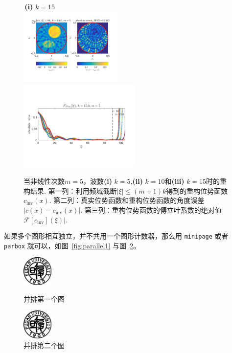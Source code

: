 \begin{figure}[H]
\,\hfill \textbf{(i)} $k = 15$ \hfill\,\\
\includegraphics[width=0.45\textwidth,trim=20 60 20 35,clip]{./figs/pwc_5_Ic_0150.png}
\includegraphics[width=0.54\textwidth,trim=10 60 30 90,clip]{./figs/pwc_5_Fc_0150.png}\\
\caption[算法2：不连续位势的重构结果]{当非线性次数$m=5$，波数\textbf{(i)} $k = 5$,\textbf{(ii)} $k = 10$和\textbf{(iii)} $k = 15$时的重构结果.
第一列：利用频域截断$|\xi| \leq (m+1)k$得到的重构位势函数$c_{\textrm{inv}}(x)$.
第二列：真实位势函数和重构位势函数的角度误差$|c(x) - c_{\textrm{inv}}(x)|$.
第三列：重构位势函数的傅立叶系数的绝对值$\mathcal{F}[c_{\textrm{inv}}](\xi)|$.
}
\label{fig:5_pwc}
\end{figure}

如果多个图形相互独立，并不共用一个图形计数器，那么用 \texttt{minipage} 或者
\texttt{parbox} 就可以，如图~\ref{fig:parallel1} 与图~\ref{fig:parallel2}。

\begin{figure}[H]
  \centering
  \begin{minipage}{0.48\textwidth}
    \centering
    \includegraphics[height=1.5cm]{./figs/fudan-emblem.pdf}
    \caption{并排第一个图}
    \label{fig:parallel1}
  \end{minipage}\hfill
  \begin{minipage}{0.48\textwidth}
    \centering
    \includegraphics[height=1.5cm]{./figs/fudan-emblem.pdf}
    \caption{并排第二个图}
    \label{fig:parallel2}
  \end{minipage}
\end{figure}

